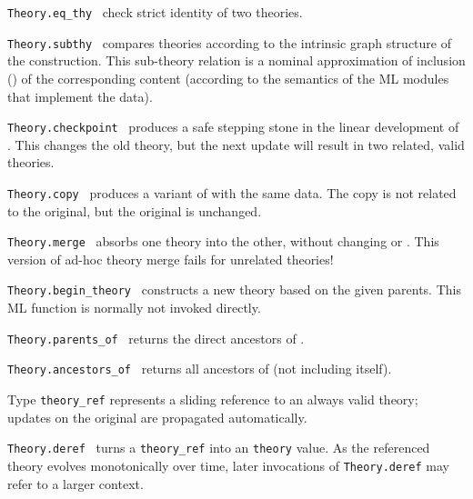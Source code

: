 \begin{isabellebody}
\begin{isamarkuptext}
\begin{description}
  \item \verb|Theory.eq_thy|~ check strict
  identity of two theories.

  \item \verb|Theory.subthy|~ compares theories
  according to the intrinsic graph structure of the construction.
  This sub-theory relation is a nominal approximation of inclusion
  (\isa{{\isasymsubseteq}}) of the corresponding content (according to the
  semantics of the ML modules that implement the data).

  \item \verb|Theory.checkpoint|~ produces a safe
  stepping stone in the linear development of .  This
  changes the old theory, but the next update will result in two
  related, valid theories.

  \item \verb|Theory.copy|~ produces a variant of  with the same data.  The copy is not related to the original,
  but the original is unchanged.

  \item \verb|Theory.merge|~ absorbs one theory
  into the other, without changing  or .
  This version of ad-hoc theory merge fails for unrelated theories!

  \item \verb|Theory.begin_theory|~ constructs
  a new theory based on the given parents.  This ML function is
  normally not invoked directly.

  \item \verb|Theory.parents_of|~ returns the direct
  ancestors of .

  \item \verb|Theory.ancestors_of|~ returns all
  ancestors of  (not including  itself).

  \item Type \verb|theory_ref| represents a sliding reference to
  an always valid theory; updates on the original are propagated
  automatically.

  \item \verb|Theory.deref|~ turns a \verb|theory_ref| into an \verb|theory| value.  As the referenced
  theory evolves monotonically over time, later invocations of \verb|Theory.deref| may refer to a larger context.


\end{description}
\end{isamarkuptext}
\end{isabellebody}
